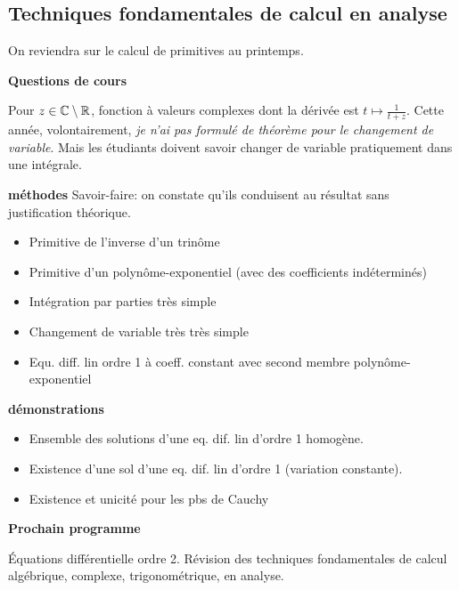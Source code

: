 





\subsection{Techniques fondamentales de calcul en analyse}




\bigskip
On reviendra sur le calcul de primitives au printemps.
\begin{center}
 \textbf{Questions de cours}
\end{center}
Pour $z\in\mathbb{C}\setminus \mathbb{R}$, fonction à valeurs complexes dont la dérivée est $t\mapsto \frac{1}{t+z}$.\newline
Cette année, volontairement, \emph{je n'ai pas formulé de théorème pour le changement de variable}. Mais les étudiants doivent savoir changer de variable pratiquement dans une intégrale.

\textbf{méthodes}\newline
Savoir-faire: on constate qu'ils conduisent au résultat sans justification théorique. 
\begin{itemize}
 \item Primitive de l'inverse d'un trinôme
 \item Primitive d'un polynôme-exponentiel (avec des coefficients indéterminés)
 \item Intégration par parties très simple
 \item Changement de variable très très simple
 \item Equ. diff. lin ordre 1 à coeff. constant avec second membre polynôme-exponentiel
\end{itemize}

\textbf{démonstrations}
\begin{itemize}
 \item Ensemble des solutions d'une eq. dif. lin d'ordre 1 homogène.
 \item Existence d'une sol d'une eq. dif. lin d'ordre 1 (variation constante).
 \item Existence et unicité pour les pbs de Cauchy 
\end{itemize}



\begin{center}
 \textbf{Prochain programme}
\end{center}

\'Equations différentielle ordre 2.\newline
Révision des techniques fondamentales de calcul algébrique, complexe, trigonométrique, en analyse.

